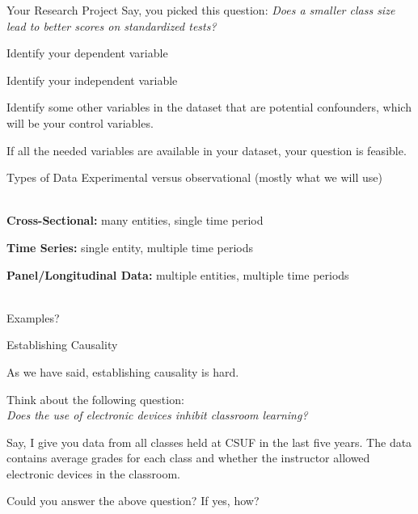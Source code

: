 \documentclass{./../div_teaching_slides}
\begin{document}
\begin{frame}{Your Research Project}
\vspace{-0.5em}
Say, you picked this question: \textit{Does a smaller class size lead to better scores on standardized tests?} \\ \vspace{0.25em}
\begin{witemize}
\item Identify your dependent variable
\item Identify your independent variable
\item Identify some other variables in the dataset that are potential confounders, which will be your control variables. \\  \vspace{0.5em}
\end{witemize}
If all the needed variables are available in your dataset, your question is feasible. \\ \vspace{0.5em}
\end{frame}

\begin{frame}{Types of Data}
Experimental versus observational (mostly what we will use) \\~\\
\begin{witemize}
\item \textbf{Cross-Sectional:} many entities, single time period
\item \textbf{Time Series:} single entity, multiple time periods 
\item \textbf{Panel/Longitudinal Data:} multiple entities, multiple time periods \\~\\
\end{witemize}
Examples?
\end{frame}

\begin{frame}{Establishing Causality}
\begin{witemize}
  \item As we have said, establishing causality is hard. 
  \item Think about the following question: \\ \vspace{0.5em}
  \textit{Does the use of electronic devices inhibit classroom learning?}
  \item Say, I give you data from all classes held at CSUF in the last five years. The data contains average grades for each class and whether the instructor allowed electronic devices in the classroom. 
  \item Could you answer the above question? If yes, how?
\end{witemize}
\end{frame}
\end{document}
